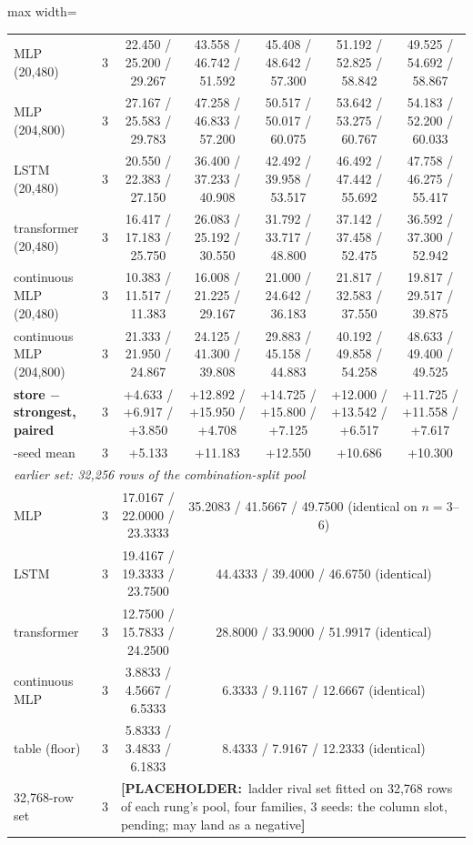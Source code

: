 \documentclass{article} %
\newcommand{\PLACEHOLDER}[1]{{\color{red}\textbf{[PLACEHOLDER:}~#1\textbf{]}}}
\begin{document}
\begin{table}[t]
\begin{adjustbox}{max width=\linewidth}
\begin{tabular}{lcccccc}
MLP (20,480) & 3 & 22.450 / 25.200 / 29.267 & 43.558 / 46.742 / 51.592 & 45.408 / 48.642 / 57.300 & 51.192 / 52.825 / 58.842 & 49.525 / 54.692 / 58.867 \\
MLP (204,800) & 3 & 27.167 / 25.583 / 29.783 & 47.258 / 46.833 / 57.200 & 50.517 / 50.017 / 60.075 & 53.642 / 53.275 / 60.767 & 54.183 / 52.200 / 60.033 \\
LSTM (20,480) & 3 & 20.550 / 22.383 / 27.150 & 36.400 / 37.233 / 40.908 & 42.492 / 39.958 / 53.517 & 46.492 / 47.442 / 55.692 & 47.758 / 46.275 / 55.417 \\
transformer (20,480) & 3 & 16.417 / 17.183 / 25.750 & 26.083 / 25.192 / 30.550 & 31.792 / 33.717 / 48.800 & 37.142 / 37.458 / 52.475 & 36.592 / 37.300 / 52.942 \\
continuous MLP (20,480) & 3 & 10.383 / 11.517 / 11.383 & 16.008 / 21.225 / 29.167 & 21.000 / 24.642 / 36.183 & 21.817 / 32.583 / 37.550 & 19.817 / 29.517 / 39.875 \\
continuous MLP (204,800) & 3 & 21.333 / 21.950 / 24.867 & 24.125 / 41.300 / 39.808 & 29.883 / 45.158 / 44.883 & 40.192 / 49.858 / 54.258 & 48.633 / 49.400 / 49.525 \\
\textbf{store $-$ strongest, paired} & 3 & +4.633 / +6.917 / +3.850 & +12.892 / +15.950 / +4.708 & +14.725 / +15.800 / +7.125 & +12.000 / +13.542 / +6.517 & +11.725 / +11.558 / +7.617 \\
\quad 3-seed mean & 3 & +5.133 & +11.183 & +12.550 & +10.686 & +10.300 \\
\midrule
\multicolumn{7}{l}{\emph{earlier set: 32,256 rows of the combination-split pool}} \\ %
MLP & 3 & 17.0167 / 22.0000 / 23.3333 & \multicolumn{4}{c}{35.2083 / 41.5667 / 49.7500 (identical on $n=3$--$6$)} \\
LSTM & 3 & 19.4167 / 19.3333 / 23.7500 & \multicolumn{4}{c}{44.4333 / 39.4000 / 46.6750 (identical)} \\
transformer & 3 & 12.7500 / 15.7833 / 24.2500 & \multicolumn{4}{c}{28.8000 / 33.9000 / 51.9917 (identical)} \\
continuous MLP & 3 & 3.8833 / 4.5667 / 6.5333 & \multicolumn{4}{c}{6.3333 / 9.1167 / 12.6667 (identical)} \\
table (floor) & 3 & 5.8333 / 3.4833 / 6.1833 & \multicolumn{4}{c}{8.4333 / 7.9167 / 12.2333 (identical)} \\
\midrule
32,768-row set & 3 & \multicolumn{5}{l}{\PLACEHOLDER{ladder rival set fitted on 32,768 rows of each rung's pool, four families, 3 seeds: the column slot, pending; may land as a negative}} \\ %
\bottomrule
\end{tabular}\end{adjustbox}
\end{table}
\end{document}
